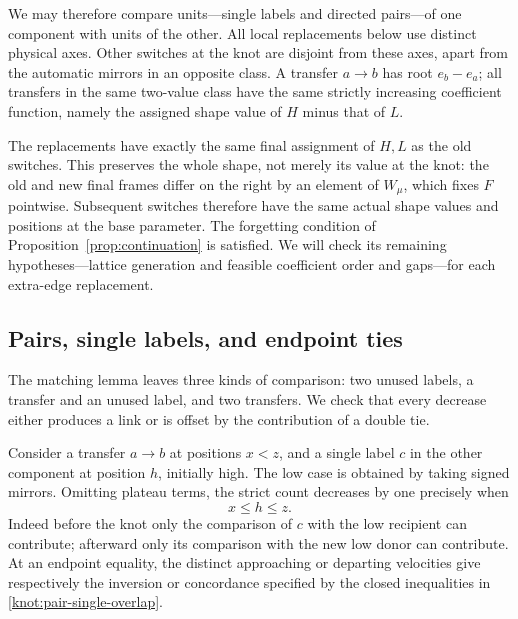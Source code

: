 We may therefore compare units---single labels and directed pairs---of
one component with units of the other.  All local replacements below
use distinct physical axes.  Other switches at the knot are disjoint
from these axes, apart from the automatic mirrors in an opposite
class.  A transfer \(a\to b\) has root \(e_b-e_a\); all transfers in
the same two-value class have the same strictly increasing coefficient
function, namely the assigned shape value of \(H\) minus that of \(L\).

The replacements have exactly the same final assignment of \(H,L\)
as the old switches.  This preserves the whole shape, not merely its
value at the knot: the old and new final frames differ on the right
by an element of \(W_\mu\), which fixes \(F\) pointwise.  Subsequent
switches therefore have the same actual shape values and positions
at the base parameter.  The forgetting condition of
Proposition~\ref{prop:continuation} is satisfied.  We will check its
remaining hypotheses---lattice generation and feasible coefficient
order and gaps---for each extra-edge replacement.

\subsection{Pairs, single labels, and endpoint ties}

The matching lemma leaves three kinds of comparison: two unused
labels, a transfer and an unused label, and two transfers. We check
that every decrease either produces a link or is offset by the
contribution of a double tie.

Consider a transfer \(a\to b\) at positions \(x<z\), and a single
label \(c\) in the other component at position \(h\), initially high.
The low case is obtained by taking signed mirrors.  Omitting plateau terms, the strict count
decreases by one precisely when
\begin{equation}\label{knot:pair-single-overlap}
 x\le h\le z.
\end{equation}
Indeed before the knot only the comparison of \(c\) with the low
recipient can contribute; afterward only its comparison with the
new low donor can contribute.  At an endpoint equality, the distinct
approaching or departing velocities give respectively the inversion
or concordance specified by the closed inequalities in
\eqref{knot:pair-single-overlap}.

